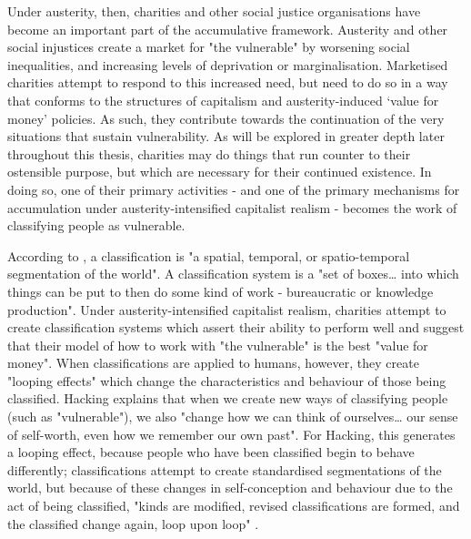 Under austerity, then, charities and other social justice organisations have become an important part of the accumulative framework. Austerity and other social injustices create a market for "the vulnerable" by worsening social inequalities, and increasing levels of deprivation or marginalisation. Marketised charities attempt to respond to this increased need, but need to do so in a way that conforms to the structures of capitalism and austerity-induced `value for money' policies. As such, they contribute towards the continuation of the very situations that sustain vulnerability. As will be explored in greater depth later throughout this thesis, charities may do things that run counter to their ostensible purpose, but which are necessary for their continued existence. In doing so, one of their primary activities - and one of the primary mechanisms for accumulation under austerity-intensified capitalist realism - becomes the work of classifying people as vulnerable.

According to \citet[110]{bowker_sorting_1999}, a classification is "a spatial, temporal, or spatio-temporal segmentation of the world". A classification system is a "set of boxes\ldots{} into which things can be put to then do some kind of work - bureaucratic or knowledge production". Under austerity-intensified capitalist realism, charities attempt to create classification systems which assert their ability to perform well and suggest that their model of how to work with "the vulnerable" is the best "value for money". When  classifications are applied to humans, however, they create "looping effects" \citep{hacking_looping_1996} which change the characteristics and behaviour of those being classified. Hacking  explains that when we create new ways of classifying people (such as "vulnerable"), we also "change how we can think of ourselves\ldots{} our sense of self-worth, even how we remember our own past". For Hacking, this generates a looping effect, because people who have been classified begin to behave differently; classifications attempt to create standardised segmentations of the world, but because of these changes in self-conception and behaviour due to the act of being classified, "kinds are modified, revised classifications are formed, and the
classified change again, loop upon loop" \citep[370]{hacking_looping_1996}.

